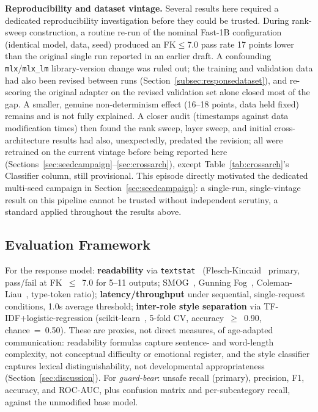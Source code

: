 \documentclass[pdflatex,sn-mathphys-num]{sn-jnl}%
\begin{document}
\noindent\textbf{Reproducibility and dataset vintage.}\label{sec:reproducibility} Several results here required a dedicated reproducibility investigation before they could be trusted. During rank-sweep construction, a routine re-run of the nominal Fast-1B configuration (identical model, data, seed) produced an FK$\leq$7.0 pass rate 17 points lower than the original single run reported in an earlier draft. A confounding \texttt{mlx}/\texttt{mlx\_lm} library-version change was ruled out; the training and validation data had also been revised between runs (Section~\ref{subsec:responsedataset}), and re-scoring the original adapter on the revised validation set alone closed most of the gap. A smaller, genuine non-determinism effect (16--18 points, data held fixed) remains and is not fully explained. A closer audit (timestamps against data modification times) then found the rank sweep, layer sweep, and initial cross-architecture results had also, unexpectedly, predated the revision; all were retrained on the current vintage before being reported here (Sections~\ref{sec:seedcampaign}--\ref{sec:crossarch}), except Table~\ref{tab:crossarch}'s Classifier column, still provisional. This episode directly motivated the dedicated multi-seed campaign in Section~\ref{sec:seedcampaign}: a single-run, single-vintage result on this pipeline cannot be trusted without independent scrutiny, a standard applied throughout the results above.

\subsection{Evaluation Framework}

For the response model: \textbf{readability} via \texttt{textstat}~\cite{bansal2023textstat} (Flesch-Kincaid~\cite{kincaid1975fk} primary, pass/fail at FK~$\leq$~7.0 for 5--11 outputs; SMOG~\cite{mclaughlin1969smog}, Gunning Fog~\cite{gunning1952fog}, Coleman-Liau~\cite{coleman1975cli}, type-token ratio); \textbf{latency/throughput} under sequential, single-request conditions, 1.0s average threshold; \textbf{inter-role style separation} via TF-IDF+logistic-regression (scikit-learn~\cite{pedregosa2011sklearn}, 5-fold CV, accuracy~$\geq$~0.90, chance~=~0.50). These are proxies, not direct measures, of age-adapted communication: readability formulas capture sentence- and word-length complexity, not conceptual difficulty or emotional register, and the style classifier captures lexical distinguishability, not developmental appropriateness (Section~\ref{sec:discussion}). For \textit{guard-bear}: unsafe recall (primary), precision, F1, accuracy, and ROC-AUC, plus confusion matrix and per-subcategory recall, against the unmodified base model.
\end{document}
